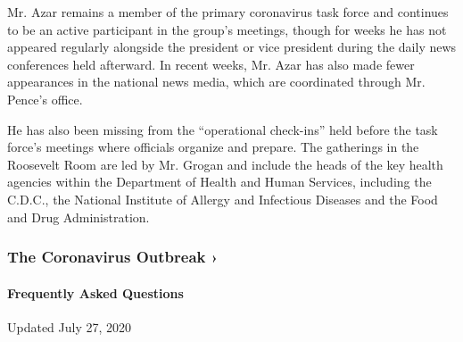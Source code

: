 Mr. Azar remains a member of the primary coronavirus task force and
continues to be an active participant in the group's meetings, though
for weeks he has not appeared regularly alongside the president or vice
president during the daily news conferences held afterward. In recent
weeks, Mr. Azar has also made fewer appearances in the national news
media, which are coordinated through Mr. Pence's office.

He has also been missing from the ``operational check-ins'' held before
the task force's meetings where officials organize and prepare. The
gatherings in the Roosevelt Room are led by Mr. Grogan and include the
heads of the key health agencies within the Department of Health and
Human Services, including the C.D.C., the National Institute of Allergy
and Infectious Diseases and the Food and Drug Administration.

\href{https://www.nytimes3xbfgragh.onion/news-event/coronavirus?action=click\&pgtype=Article\&state=default\&region=MAIN_CONTENT_3\&context=storylines_faq}{}

\hypertarget{the-coronavirus-outbreak-}{%
\subsubsection{The Coronavirus Outbreak
›}\label{the-coronavirus-outbreak-}}

\hypertarget{frequently-asked-questions}{%
\paragraph{Frequently Asked
Questions}\label{frequently-asked-questions}}

Updated July 27, 2020

